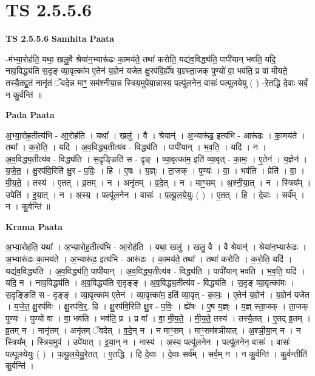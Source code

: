 \documentclass[17pt]{extarticle}
\begin{document}
\section{ TS 2.5.5.6 }

\textbf{TS 2.5.5.6 } \newline
\textbf{Samhita Paata} \newline

-म॑भ्या॒रोह॑ति॒ यथा॒ खलु॒वै श्रेया॑न॒भ्यारू॑ढः का॒मय॑ते॒ तथा॑ करोति॒ यद्य॑व॒विद्ध्य॑ति॒ पापी॑यान् भवति॒ यदि॒ नाव॒विद्ध्य॑ति स॒दृङ् व्या॒वृत्का॑म ए॒तेन॑ य॒ज्ञेन॑ यजेत क्षु॒रप॑वि॒र्ह्ये॑ष य॒ज्ञ्स्ता॒जक् पुण्यो॑ वा॒ भव॑ति॒ प्र वा॑ मीयते॒ तस्यै॒तद्व्र॒तं नानृ॑तं ॅवदे॒न्न माꣳ॒॒ सम॑श्नीया॒न्न स्त्रिय॒मुपे॑या॒न्नास्य॒ पल्पू॑लनेन॒ वासः॑ पल्पूलयेयु ( ) -रे॒तद्धि दे॒वाः सर्वं॒ न कु॒र्वन्ति॑ ॥ \newline

\textbf{Pada Paata} \newline

अ॒भ्या॒रोह॒तीत्य॑भि - आ॒रोह॑ति । यथा᳚ । खलु॑ । वै । श्रेयान्॑ । अ॒भ्यारू॑ढ॒ इत्य॑भि - आरू॑ढः । का॒मय॑ते । तथा᳚ । क॒रो॒ति॒ । यदि॑ । अ॒व॒विद्ध्य॒तीत्य॑व - विद्ध्य॑ति । पापी॑यान् । भ॒व॒ति॒ । यदि॑ । न । अ॒व॒विद्ध्य॒तीत्य॑व - विद्ध्य॑ति । स॒दृङ्ङिति॑ स - दृङ् । व्या॒वृत्का॑म॒ इति॑ व्या॒वृत् - का॒मः॒ । ए॒तेन॑ । य॒ज्ञेन॑ । य॒जे॒त॒ । क्षु॒रप॑वि॒रिति॑ क्षु॒र - प॒विः॒ । हि । ए॒षः । य॒ज्ञ्ः । ता॒जक् । पुण्यः॑ । वा॒ । भव॑ति । प्रेति॑ । वा॒ । मी॒य॒ते॒ । तस्य॑ । ए॒तत् । व्र॒तम् । न । अनृ॑तम् । व॒दे॒त् । न । माꣳ॒॒सम् । अ॒श्नी॒या॒त् । न । स्त्रिय᳚म् । उपेति॑ । इ॒या॒त् । न । अ॒स्य॒ । पल्पू॑लनेन । वासः॑ । प॒ल्पू॒ल॒ये॒युः॒ ( ) । ए॒तत् । हि । दे॒वाः । सर्व᳚म् । न । कु॒र्वन्ति॑ ॥  \newline


\textbf{Krama Paata} \newline

अ॒भ्या॒रोह॑ति॒ यथा᳚ । अ॒भ्या॒रोह॒तीत्य॑भि - आ॒रोह॑ति । यथा॒ खलु॑ । खलु॒ वै । वै श्रेयान्॑ । श्रेया॑न॒भ्यारू॑ढः । अ॒भ्यारू॑ढः का॒मय॑ते । अ॒भ्यारू॑ढ॒ इत्य॑भि - आरू॑ढः । का॒मय॑ते॒ तथा᳚ । तथा॑ करोति । क॒रो॒ति॒ यदि॑ । यद्य॑व॒विद्ध्य॑ति । अ॒व॒विद्ध्य॑ति॒ पापी॑यान् । अ॒व॒विद्ध्य॒तीत्य॑व - विद्ध्य॑ति । पापी॑यान् भवति । भ॒व॒ति॒ यदि॑ । यदि॒ न । नाव॒विद्ध्य॑ति । अ॒व॒विद्ध्य॑ति स॒दृङ्ङ् । अ॒व॒विद्ध्य॒तीत्य॑व - विद्ध्य॑ति । स॒दृङ् व्या॒वृत्का॑मः । स॒दृङ्ङिति॑ स - दृङ्ङ् । व्या॒वृत्का॑म ए॒तेन॑ । व्या॒वृत्का॑म॒ इति॑ व्या॒वृत् - का॒मः॒ । ए॒तेन॑ य॒ज्ञेन॑ । य॒ज्ञेन॑ यजेत । य॒जे॒त॒ क्षु॒रप॑विः । क्षु॒रप॑वि॒र्॒. हि । क्षु॒रप॑वि॒रिति॑ क्षु॒र - प॒विः॒ । ह्ये॑षः । ए॒ष य॒ज्ञ्ः । य॒ज्ञ् स्ता॒जक् । ता॒जक् पुण्यः॑ । पुण्यो॑ वा । वा॒ भव॑ति । भव॑ति॒ प्र । प्र वा᳚ । वा॒ मी॒य॒ते॒ । मी॒य॒ते॒ तस्य॑ । तस्यै॒तत् । ए॒तद् व्र॒तम् । व्र॒तम् न । नानृ॑तम् । अनृ॑तम् ॅवदेत् । व॒दे॒न् न । न माꣳ॒॒सम् । माꣳ॒॒सम॑श्ञीयात् । अ॒श्ञी॒या॒न् न । न स्त्रिय᳚म् । स्त्रिय॒मुप॑ । उपे॑यात् । इ॒या॒न् न । नास्य॑ । अ॒स्य॒ पल्पू॑लनेन । पल्पू॑लनेन॒ वासः॑ । वासः॑ पल्पूलयेयुः ( ) । प॒ल्पू॒ल॒ये॒यु॒रे॒तत् । ए॒तद्धि । हि दे॒वाः । दे॒वाः सर्व᳚म् । सर्व॒म् न । न कु॒र्वन्ति॑ । कु॒र्वन्तीति॑ कु॒र्वन्ति॑ । \newline
\end{document}
